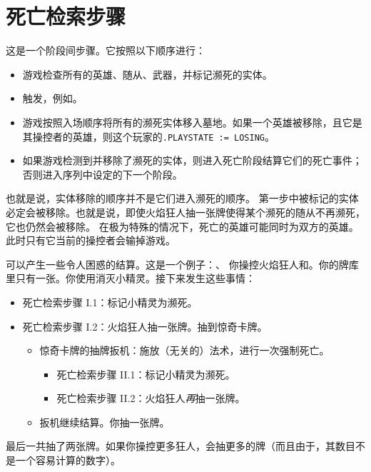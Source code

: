 \section{死亡检索步骤}
\label{death-creation-step}

这是一个阶段间步骤。它按照以下顺序进行：

\begin{itemize}
    \item 游戏检查所有的英雄、随从、武器，并标记濒死的实体。
    \item {}触发，例如。
    \item 游戏按照入场顺序将所有的濒死实体移入墓地。如果一个英雄被移除，且它是其操控者的英雄，则这个玩家的\texttt{.PLAYSTATE := LOSING}。
    \item 如果游戏检测到并移除了濒死的实体，则进入死亡阶段结算它们的死亡事件；否则进入序列中设定的下一个阶段。
\end{itemize}

\notice 也就是说，实体移除的顺序并不是它们进入濒死的顺序。
\notice 第一步中被标记的实体必定会被移除。也就是说，即使火焰狂人抽一张牌使得某个濒死的随从不再濒死，它也仍然会被移除。
\notice 在极为特殊的情况下，死亡的英雄可能同时为双方的英雄。此时只有它当前的操控者会输掉游戏。

可以产生一些令人困惑的结算。这是一个例子：、
\example 你操控火焰狂人和。你的牌库里只有一张。你使用消灭小精灵。接下来发生这些事情：

\begin{itemize}
    \item 死亡检索步骤 I.1：标记小精灵为濒死。
    \item 死亡检索步骤 I.2：火焰狂人抽一张牌。抽到惊奇卡牌。
    \begin{itemize}
        \item 惊奇卡牌的抽牌扳机：施放（无关的）法术，进行一次强制死亡。
        \begin{itemize}
            \item 死亡检索步骤 II.1：标记小精灵为濒死。
            \item 死亡检索步骤 II.2：火焰狂人\emph{再}抽一张牌。
        \end{itemize}
        \item 扳机继续结算。你抽一张牌。
    \end{itemize}
\end{itemize}

\noindent 最后一共抽了两张牌。如果你操控更多狂人，会抽更多的牌（而且由于，其数目不是一个容易计算的数字）。

